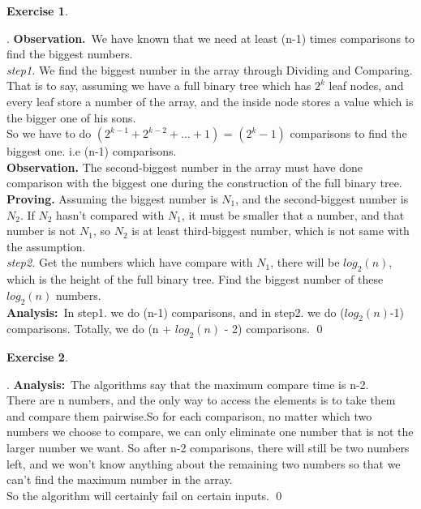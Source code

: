\documentclass[12pt, notitlepage]{article}
\newtheorem{ex}{Exercise}
\newenvironment{sol}
  {\par\vspace{3mm}\noindent{\it Solution}.}{\qed}
\begin{document}
\begin{ex}\end{ex}
\begin{sol}
\textbf{Observation.}~We have known that we need at least (n-1) times comparisons to find the biggest numbers.\\

\emph{step1.} We find the biggest number in the array through Dividing and Comparing. That is to say, assuming we have a full binary tree which has $2^k$ leaf nodes, and every leaf store a number of the array, and the inside node stores a value which is the bigger one of his sons.\\
So we have to do $(2^{k-1}+2^{k-2}+...+1)$ = $(2^k-1)$ comparisons to find the biggest one. i.e (n-1) comparisons.\\

\textbf{Observation.} The second-biggest number in the array must have done comparison with the biggest one during the construction of the full binary tree.\\
\textbf{Proving.} Assuming the biggest number is $N_1$, and the second-biggest number is $N_2$. If $N_2$ hasn't compared with $N_1$, it must be smaller that a number, and that number is not $N_1$, so $N_2$ is at least third-biggest number, which is not same with the assumption.\\

\emph{step2.} Get the numbers which have compare with $N_1$, there will be $log_2(n)$, which is the height of the full binary tree. Find the biggest number of these $log_2(n)$ numbers.\\

\textbf{Analysis:}~In step1. we do (n-1) comparisons, and in step2. we do ($log_2(n)$-1) comparisons. Totally, we do (n + $log_2(n)$ - 2) comparisons.
\end{sol}


\begin{ex}\end{ex}
\begin{sol}
\textbf{Analysis:}~The algorithms say that the maximum compare time is n-2.\\
 There are n numbers, and the only way to access the elements is to take them and compare them pairwise.So for each comparison, no matter which two numbers we choose to compare, we can only eliminate one number that is not the larger number we want. So after n-2 comparisons, there will still be two numbers left, and we won’t know anything about the remaining two numbers so that we can’t find the maximum number in the array.\\
So the algorithm will certainly fail on certain inputs.
\end{sol}
\end{document}
